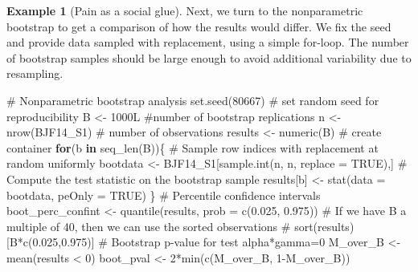 \documentclass[
  11pt,
  letterpaper,
]{scrbook}
\newenvironment{Shaded}{\begin{snugshade}}{\end{snugshade}}
\newcommand{\AttributeTok}[1]{\textcolor[rgb]{0.40,0.45,0.13}{#1}}
\newcommand{\CommentTok}[1]{\textcolor[rgb]{0.37,0.37,0.37}{#1}}
\newcommand{\ConstantTok}[1]{\textcolor[rgb]{0.56,0.35,0.01}{#1}}
\newcommand{\ControlFlowTok}[1]{\textcolor[rgb]{0.00,0.23,0.31}{\textbf{#1}}}
\newcommand{\DecValTok}[1]{\textcolor[rgb]{0.68,0.00,0.00}{#1}}
\newcommand{\FloatTok}[1]{\textcolor[rgb]{0.68,0.00,0.00}{#1}}
\newcommand{\FunctionTok}[1]{\textcolor[rgb]{0.28,0.35,0.67}{#1}}
\newcommand{\NormalTok}[1]{\textcolor[rgb]{0.00,0.23,0.31}{#1}}
\newcommand{\OtherTok}[1]{\textcolor[rgb]{0.00,0.23,0.31}{#1}}
\newcommand{\SpecialCharTok}[1]{\textcolor[rgb]{0.37,0.37,0.37}{#1}}
\theoremstyle{definition}
\theoremstyle{definition}
\newtheorem{example}{Example}[chapter]
\theoremstyle{remark}
\begin{document}
\begin{example}[Pain as a social
glue]
Next, we turn to the nonparametric bootstrap to get a comparison of how
the results would differ. We fix the seed and provide data sampled with
replacement, using a simple for-loop. The number of bootstrap samples
should be large enough to avoid additional variability due to
resampling.

\begin{Shaded}
\begin{Highlighting}[]
\CommentTok{\# Nonparametric bootstrap analysis}
\FunctionTok{set.seed}\NormalTok{(}\DecValTok{80667}\NormalTok{) }\CommentTok{\# set random seed for reproducibility}
\NormalTok{B }\OtherTok{\textless{}{-}} \DecValTok{1000}\NormalTok{L }\CommentTok{\#number of bootstrap replications}
\NormalTok{n }\OtherTok{\textless{}{-}} \FunctionTok{nrow}\NormalTok{(BJF14\_S1) }\CommentTok{\# number of observations}
\NormalTok{results }\OtherTok{\textless{}{-}} \FunctionTok{numeric}\NormalTok{(B) }\CommentTok{\# create container}
\ControlFlowTok{for}\NormalTok{(b }\ControlFlowTok{in} \FunctionTok{seq\_len}\NormalTok{(B))\{}
  \CommentTok{\# Sample row indices with replacement at random uniformly}
\NormalTok{  bootdata }\OtherTok{\textless{}{-}}\NormalTok{ BJF14\_S1[}\FunctionTok{sample.int}\NormalTok{(n, n, }\AttributeTok{replace =} \ConstantTok{TRUE}\NormalTok{),]}
  \CommentTok{\# Compute the test statistic on the bootstrap sample}
\NormalTok{  results[b] }\OtherTok{\textless{}{-}} \FunctionTok{stat}\NormalTok{(}\AttributeTok{data =}\NormalTok{ bootdata, }\AttributeTok{peOnly =} \ConstantTok{TRUE}\NormalTok{)}
\NormalTok{\}}
\CommentTok{\# Percentile confidence intervals}
\NormalTok{boot\_perc\_confint }\OtherTok{\textless{}{-}} \FunctionTok{quantile}\NormalTok{(results, }\AttributeTok{prob =} \FunctionTok{c}\NormalTok{(}\FloatTok{0.025}\NormalTok{, }\FloatTok{0.975}\NormalTok{))}
\CommentTok{\# If we have B a multiple of 40, then we can use the sorted observations}
\CommentTok{\# sort(results)[B*c(0.025,0.975)]}
\CommentTok{\# Bootstrap p{-}value for test alpha*gamma=0}
\NormalTok{M\_over\_B }\OtherTok{\textless{}{-}} \FunctionTok{mean}\NormalTok{(results }\SpecialCharTok{\textless{}} \DecValTok{0}\NormalTok{)}
\NormalTok{boot\_pval }\OtherTok{\textless{}{-}} \DecValTok{2}\SpecialCharTok{*}\FunctionTok{min}\NormalTok{(}\FunctionTok{c}\NormalTok{(M\_over\_B, }\DecValTok{1}\SpecialCharTok{{-}}\NormalTok{M\_over\_B))}
\end{Highlighting}
\end{Shaded}

\begin{longtable}[]{@{}rrrrr@{}}


\end{longtable}
\end{example}
\end{document}
